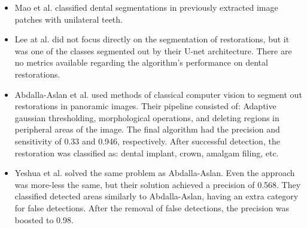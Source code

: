 \begin{itemize}
    \item{Mao et al. \cite{Mao2021}} classified dental segmentations in previously extracted image patches with unilateral teeth.
    \item{Lee at al. \cite{Lee2021}} did not focus directly on the segmentation of restorations, but it was one of the classes segmented out by their U-net architecture. There are no metrics available regarding the algorithm's performance on dental restorations.
    \item{Abdalla-Aslan et al. \cite{AbdallaAslan2020}} used methods of classical computer vision to segment out restorations in panoramic images. Their pipeline consisted of: Adaptive gaussian thresholding, morphological operations, and deleting regions in peripheral areas of the image. The final algorithm had the precision and sensitivity of 0.33 and 0.946, respectively. After successful detection, the restoration was classified as: dental implant, crown, amalgam filing, etc.
    \item {Yeshua et al. \cite{Yeshua2019}} solved the same problem as Abdalla-Aslan. Even the approach was more-less the same, but their solution achieved a precision of 0.568. They classified detected areas similarly to Abdalla-Aslan, having an extra category for false detections. After the removal of false detections, the precision was boosted to 0.98.
\end{itemize}